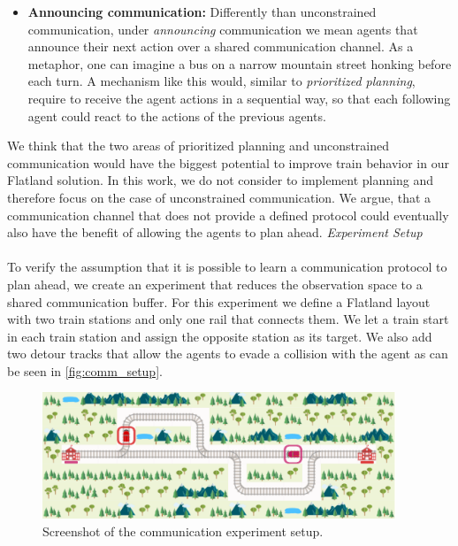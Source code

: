 \begin{itemize}
	\item \textbf{Announcing communication:} Differently than unconstrained communication, under \textit{announcing} communication we mean agents that announce their next action over a shared communication channel. As a metaphor, one can imagine a bus on a narrow mountain street honking before each turn. A mechanism like this would, similar to \textit{prioritized planning}, require to receive the agent actions in a sequential way, so that each following agent could react to the actions of the previous agents.
\end{itemize}

We think that the two areas of prioritized planning and unconstrained communication would have the biggest potential to improve train behavior in our Flatland solution. In this work, we do not consider to implement planning and therefore focus on the case of unconstrained communication. We argue, that a communication channel that does not provide a defined protocol could eventually also have the benefit of allowing the agents to plan ahead.
\newpage
\textit{Experiment Setup}\\\\
To verify the assumption that it is possible to learn a communication protocol to plan ahead, we create an experiment that reduces the observation space to a shared communication buffer. For this experiment we define a Flatland layout with two train stations and only one rail that connects them. We let a train start in each train station and assign the opposite station as its target. We also add two detour tracks that allow the agents to evade a collision with the agent as can be seen in \autoref{fig:comm_setup}.

\begin{figure}[H]
	\centering
	\includegraphics[width=300pt]{images/communication_experiment.png}
	\caption{Screenshot of the communication experiment setup.}
	\label{fig:comm_setup}
\end{figure}


